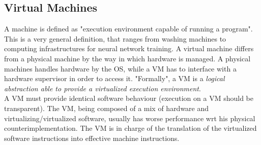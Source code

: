 \documentclass{article}
\begin{document}
			\subsection{Virtual Machines}
				A machine is defined as "execution environment capable of running a program". This is a very general definition, that ranges from washing machines to computing infrastructures for neural network training. A virtual machine differs from a physical machine by the way in which hardware is managed. A physical machines handles hardware by the OS, while a VM has to interface with a hardware supervisor in order to access it. "Formally", a VM is a \emph{logical abstraction able to provide a virtualized execution environment}.\\
				A VM must provide identical software behaviour (execution on a VM should be transparent). The VM, being composed of a mix of hardware and virtualizing/virtualized software, usually has worse performance wrt his physical counterimplementation. The VM is in charge of the translation of the virtualized software instructions into effective machine instructions. 
	
\end{document}
